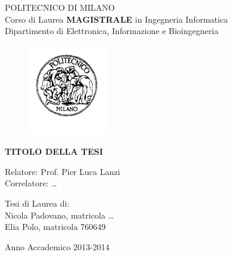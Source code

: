 \thispagestyle{empty}
\vspace*{-1.5cm} \bfseries{
\begin{center}
  \large
  POLITECNICO DI MILANO\\
  \normalsize
  Corso di Laurea \textbf{MAGISTRALE} in Ingegneria Informatica\\
  Dipartimento di Elettronica, Informazione e Bioingegneria\\
  \begin{figure}[htbp]
    \begin{center}
      \includegraphics[width=3.5cm]{./pictures/logopm}
    \end{center}
  \end{figure}
  \vspace*{0.3cm} \LARGE



  \textbf{TITOLO DELLA TESI}\\



\end{center}
\vspace*{3.0cm} \large
\begin{flushleft}


  Relatore: Prof. Pier Luca Lanzi \\
  Correlatore: \dots

\end{flushleft}
\vspace*{1.0cm}
\begin{flushright}


  Tesi di Laurea di:\\ Nicola Padovano, matricola \dots \\ 
		       Elia Polo, matricola 760649 \\


\end{flushright}
\vspace*{0.5cm}
\begin{center}



  Anno Accademico 2013-2014
\end{center} \clearpage
}
